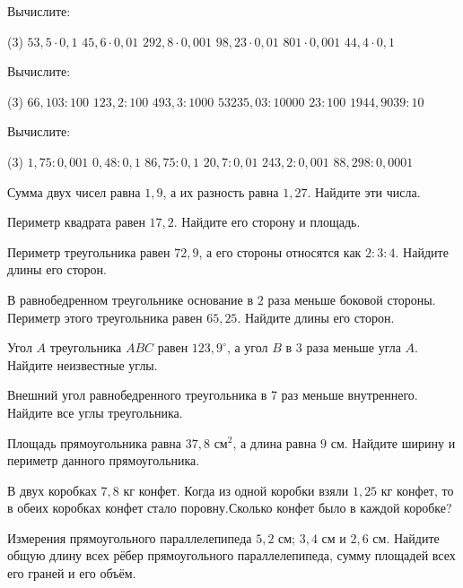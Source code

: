 \begin{class}[number=4]
	\begin{listofex}
		\item Вычислите:
		\begin{tasks}(3)
			\task \( 53,5\cdot0,1 \)
			\task \( 45,6\cdot0,01 \)
			\task \( 292,8\cdot0,001 \)
			\task \( 98,23\cdot0,01 \)
			\task \( 801\cdot0,001 \)
			\task \( 44,4\cdot0,1 \)
		\end{tasks}
		\item Вычислите:
		\begin{tasks}(3)
			\task \( 66,103:100 \)
			\task \( 123,2:100 \)
			\task \( 493,3:1000 \)
			\task \( 53235,03:10000 \)
			\task \( 23:100 \)
			\task \( 1944,9039:10 \)
		\end{tasks}
		\item Вычислите:
		\begin{tasks}(3)
			\task \( 1,75:0,001 \)
			\task \( 0,48:0,1 \)
			\task \( 86,75:0,1\)
			\task \( 20,7:0,01 \)
			\task \( 243,2:0,001 \)
			\task \( 88,298:0,0001 \)
		\end{tasks}
		\item Сумма двух чисел равна \( 1,9 \), а их разность равна \( 1,27 \). Найдите эти числа.
		\item Периметр квадрата равен \( 17,2 \). Найдите его сторону и площадь.
		\item Периметр треугольника равен \( 72,9 \), а его стороны относятся как \( 2:3:4 \). Найдите длины его сторон.
		\item В равнобедренном треугольнике основание в \( 2 \) раза меньше боковой стороны. Периметр этого треугольника равен \( 65,25 \). Найдите длины его сторон.
		\item Угол \( A \) треугольника \( ABC \) равен \( 123,9^{\circ} \), а угол \( B \) в \( 3 \) раза меньше угла \( A \). Найдите неизвестные углы.
		\item Внешний угол равнобедренного треугольника в 7 раз меньше внутреннего. Найдите все углы треугольника.
		\item Площадь прямоугольника равна \( 37,8 \) см\( ^{2} \), а длина равна \( 9 \) см. Найдите ширину и периметр данного прямоугольника.
		\item В двух коробках \( 7,8 \) кг конфет. Когда из одной коробки взяли \( 1,25 \) кг конфет, то в обеих коробках конфет стало поровну.Сколько конфет было в каждой коробке?
		\item Измерения прямоугольного параллелепипеда \( 5,2 \) см; \( 3,4 \) см и \( 2,6 \) см. Найдите общую длину всех рёбер прямоугольного параллелепипеда, сумму площадей всех его граней и его объём.
	\end{listofex}
\end{class}

